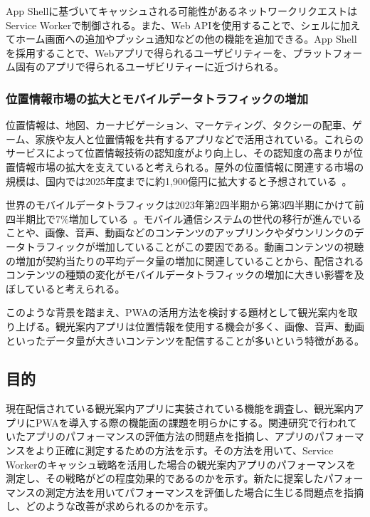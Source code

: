 App Shellに基づいてキャッシュされる可能性があるネットワークリクエストはService Workerで制御される。また、Web APIを使用することで、シェルに加えてホーム画面への追加やプッシュ通知などの他の機能を追加できる。App Shellを採用することで、Webアプリで得られるユーザビリティーを、プラットフォーム固有のアプリで得られるユーザビリティーに近づけられる。
\subsubsection{位置情報市場の拡大とモバイルデータトラフィックの増加}
\label{subsubsection:位置情報市場の拡大とモバイルデータトラフィックの増加}
位置情報は、地図、カーナビゲーション、マーケティング、タクシーの配車、ゲーム、家族や友人と位置情報を共有するアプリなどで活用されている。これらのサービスによって位置情報技術の認知度がより向上し、その認知度の高まりが位置情報市場の拡大を支えていると考えられる。屋外の位置情報に関連する市場の規模は、国内では2025年度までに約1,900億円に拡大すると予想されている~\cite{MIC2023InformationStatistics}。

世界のモバイルデータトラフィックは2023年第2四半期から第3四半期にかけて前四半期比で7\%増加している~\cite{EricssonNovember2023MobilityReportDataAndForecasts}。モバイル通信システムの世代の移行が進んでいることや、画像、音声、動画などのコンテンツのアップリンクやダウンリンクのデータトラフィックが増加していることがこの要因である。動画コンテンツの視聴の増加が契約当たりの平均データ量の増加に関連していることから、配信されるコンテンツの種類の変化がモバイルデータトラフィックの増加に大きい影響を及ぼしていると考えられる。

このような背景を踏まえ、PWAの活用方法を検討する題材として観光案内を取り上げる。観光案内アプリは位置情報を使用する機会が多く、画像、音声、動画といったデータ量が大きいコンテンツを配信することが多いという特徴がある。

\subsection{目的}
\label{subsection:目的}
現在配信されている観光案内アプリに実装されている機能を調査し、観光案内アプリにPWAを導入する際の機能面の課題を明らかにする。関連研究で行われていたアプリのパフォーマンスの評価方法の問題点を指摘し、アプリのパフォーマンスをより正確に測定するための方法を示す。その方法を用いて、Service Workerのキャッシュ戦略を活用した場合の観光案内アプリのパフォーマンスを測定し、その戦略がどの程度効果的であるのかを示す。新たに提案したパフォーマンスの測定方法を用いてパフォーマンスを評価した場合に生じる問題点を指摘し、どのような改善が求められるのかを示す。
